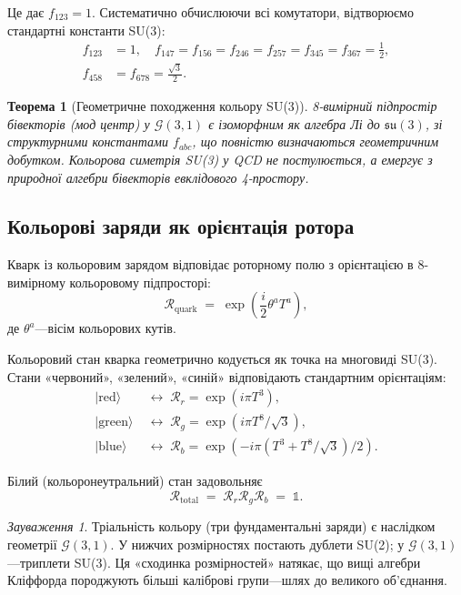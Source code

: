 \documentclass[11pt,a4paper]{article}
\newcommand{\Rotor}{\mathcal{R}}
\newcommand{\Cl}{\mathcal{G}}
\theoremstyle{definition}
\theoremstyle{plain}
\newtheorem{theorem}{Теорема}[section]
\theoremstyle{remark}
\newtheorem{remark}{Зауваження}[section]
\begin{document}
Це дає $f_{123}=1$. Систематично обчислюючи всі комутатори, відтворюємо стандартні константи SU(3):
\begin{align}
f_{123} &= 1, \quad f_{147}=f_{156}=f_{246}=f_{257}=f_{345}=f_{367}=\frac{1}{2}, \nonumber \\
f_{458} &= f_{678} = \frac{\sqrt{3}}{2}.
\label{eq:structure-constants}
\end{align}

\begin{theorem}[Геометричне походження кольору SU(3)]
8-вимірний підпростір бівекторів (мод центр) у $\Cl(3,1)$ є ізоморфним як алгебра Лі до $\mathfrak{su}(3)$, зі структурними константами $f_{abc}$, що повністю визначаються геометричним добутком. Кольорова симетрія SU(3) у QCD не постулюється, а емергує з природної алгебри бівекторів евклідового 4-простору.
\end{theorem}

\subsection{Кольорові заряди як орієнтація ротора}

Кварк із кольоровим зарядом відповідає роторному полю з орієнтацією в 8-вимірному кольоровому підпросторі:
\begin{equation}
\Rotor_{\mathrm{quark}} \;=\; \exp\left(\frac{i}{2}\theta^a T^a\right),
\label{eq:quark-rotor}
\end{equation}
де $\theta^a$—вісім кольорових кутів.

Кольоровий стан кварка геометрично кодується як точка на многовиді SU(3). Стани «червоний», «зелений», «синій» відповідають стандартним орієнтаціям:
\begin{align}
|\mathrm{red}\rangle &\;\leftrightarrow\; \Rotor_r = \exp(i\pi T^3), \\
|\mathrm{green}\rangle &\;\leftrightarrow\; \Rotor_g = \exp(i\pi T^8/\sqrt{3}), \\
|\mathrm{blue}\rangle &\;\leftrightarrow\; \Rotor_b = \exp(-i\pi(T^3 + T^8/\sqrt{3})/2).
\end{align}

Білий (кольоронеутральний) стан задовольняє
\begin{equation}
\Rotor_{\mathrm{total}} \;=\; \Rotor_r \Rotor_g \Rotor_b \;=\; \mathbb{1}.
\end{equation}

\begin{remark}
Тріальність кольору (три фундаментальні заряди) є наслідком геометрії $\Cl(3,1)$. У нижчих розмірностях постають дублети SU(2); у $\Cl(3,1)$—триплети SU(3). Ця «сходинка розмірностей» натякає, що вищі алгебри Кліффорда породжують більші каліброві групи—шлях до великого об’єднання.
\end{remark}
\end{document}
